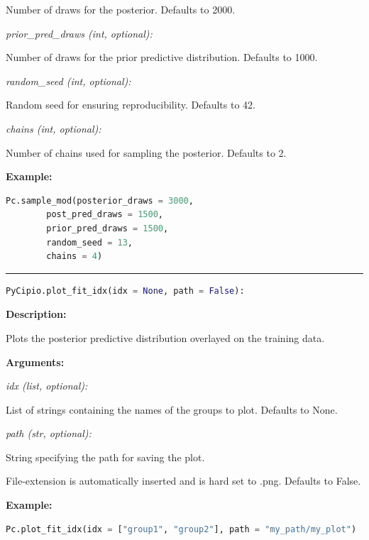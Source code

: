 \documentclass{article}
\begin{document}
\indent \indent \indent Number of draws for the posterior. Defaults to 2000.

\indent \indent \textit{prior\_pred\_draws (int, optional):} 

\indent \indent \indent Number of draws for the prior predictive distribution. Defaults to 1000.

\indent \indent \textit{random\_seed (int, optional):}

\indent \indent \indent Random seed for ensuring reproducibility. Defaults to 42.

\indent \indent \textit{chains (int, optional):} 

\indent \indent \indent Number of chains used for sampling the posterior. Defaults to 2.

\indent \textbf{Example:}

\begin{lstlisting}[language=Python]
        Pc.sample_mod(posterior_draws = 3000, 
        post_pred_draws = 1500, 
        prior_pred_draws = 1500, 
        random_seed = 13, 
        chains = 4)
\end{lstlisting}


\hrule

\begin{lstlisting}[language=Python]
    PyCipio.plot_fit_idx(idx = None, path = False):
\end{lstlisting}

\indent \textbf{Description:} 

\indent \indent Plots the posterior predictive distribution overlayed on the training data.

\indent \textbf{Arguments:}

\indent \indent \textit{idx (list, optional):} 

\indent \indent \indent List of strings containing the names of the groups to plot. Defaults to None.

\indent \indent \textit{path (str, optional):}

\indent \indent \indent String specifying the path for saving the plot. 

\indent \indent \indent File-extension is automatically inserted and is hard set to .png. Defaults to False.

\indent \textbf{Example:}

\begin{lstlisting}[language=Python]
        Pc.plot_fit_idx(idx = ["group1", "group2"], path = "my_path/my_plot")
\end{lstlisting}
\end{document}
